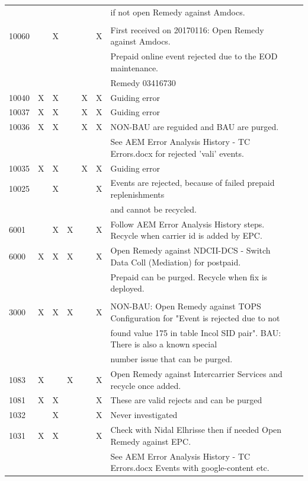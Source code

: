 \documentclass[12pt,twoside]{article}
\begin{document}
\begin{landscape}
\begin{longtable}{l|l|l|l|l|l|l|l|l}
 &  &  &  &  &  & if not open Remedy against Amdocs.\\
 &  &  &  &  &  & \\
10060 &  & X &  &  & X & First received on 20170116:  Open Remedy against Amdocs.\\
 &  &  &  &  &  & Prepaid online event rejected due to the EOD maintenance.\\
 &  &  &  &  &  & Remedy 03416730\\
10040 & X & X &  & X & X & Guiding error\\
10037 & X & X &  & X & X & Guiding error\\
10036 & X & X &  & X & X & NON-BAU are reguided and BAU are purged.\\
 &  &  &  &  &  & See AEM Error Analysis History - TC Errors.docx  for rejected 'vali' events.\\
10035 & X & X &  & X & X & Guiding error\\
10025 &  & X &  &  & X & Events are rejected, because of failed prepaid replenishments\\
 &  &  &  &  &  & and cannot be recycled.\\
6001 &  & X & X &  & X & Follow AEM Error Analysis History steps.  Recycle when carrier id is added by EPC.\\
6000 & X & X & X &  & X & Open Remedy against NDCII-DCS - Switch Data Coll (Mediation) for postpaid.\\
 &  &  &  &  &  & Prepaid can be purged.  Recycle when fix is deployed.\\
 &  &  &  &  &  & \\
3000 & X & X & X &  & X & NON-BAU: Open Remedy against TOPS Configuration for "Event is rejected due to not\\
 &  &  &  &  &  & found value 175 in table Incol SID pair".  BAU:  There is also a known special\\
 &  &  &  &  &  & number issue that can be purged.\\
1083 & X &  & X &  & X & Open Remedy against Intercarrier Services and recycle once added.\\
1081 & X & X &  &  & X & These are valid rejects and can be purged\\
1032 &  & X &  &  & X & Never investigated\\
1031 & X & X &  &  & X & Check with Nidal Elhrisse then if needed Open Remedy against EPC.\\
 &  &  &  &  &  & See AEM Error Analysis History - TC Errors.docx  Events with google-content etc.\\

\end{longtable}
\end{landscape}
\end{document}

